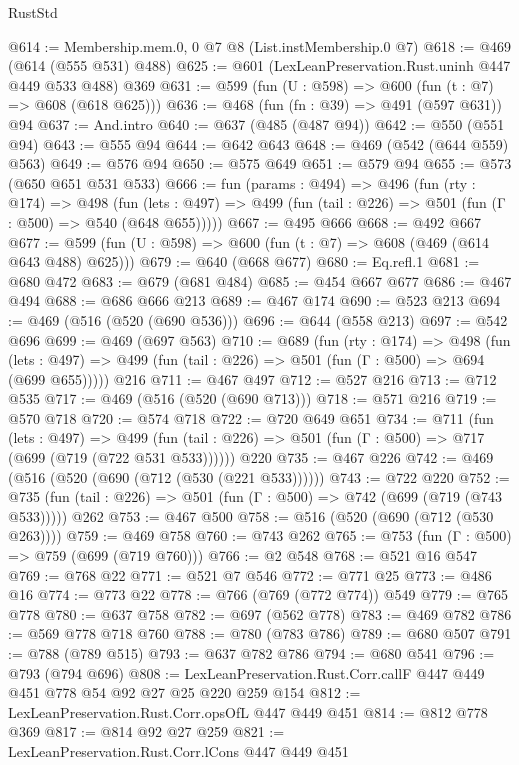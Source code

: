 \begin{lexlean}{RustStd}
\begin{coremodule}
@614 := Membership.mem.{0, 0} @7 @8 (List.instMembership.{0} @7)
@618 := @469 (@614 (@555 @531) @488)
@625 := @601 (LexLeanPreservation.Rust.uninh @447 @449 @533 @488) @369
@631 := @599 (fun (U : @598) => @600 (fun (t : @7) => @608 (@618 @625)))
@636 := @468 (fun (fn : @39) => @491 (@597 @631)) @94
@637 := And.intro
@640 := @637 (@485 (@487 @94))
@642 := @550 (@551 @94)
@643 := @555 @94
@644 := @642 @643
@648 := @469 (@542 (@644 @559) @563)
@649 := @576 @94
@650 := @575 @649
@651 := @579 @94
@655 := @573 (@650 @651 @531 @533)
@666 := fun (params : @494) =>
  @496
    (fun (rty : @174) =>
    @498
      (fun (lets : @497) => @499 (fun (tail : @226) => @501 (fun (Γ : @500) => @540 (@648 @655)))))
@667 := @495 @666
@668 := @492 @667
@677 := @599 (fun (U : @598) => @600 (fun (t : @7) => @608 (@469 (@614 @643 @488) @625)))
@679 := @640 (@668 @677)
@680 := Eq.refl.{1}
@681 := @680 @472
@683 := @679 (@681 @484)
@685 := @454 @667 @677
@686 := @467 @494
@688 := @686 @666 @213
@689 := @467 @174
@690 := @523 @213
@694 := @469 (@516 (@520 (@690 @536)))
@696 := @644 (@558 @213)
@697 := @542 @696
@699 := @469 (@697 @563)
@710 := @689
    (fun (rty : @174) =>
    @498
      (fun (lets : @497) => @499 (fun (tail : @226) => @501 (fun (Γ : @500) => @694 (@699 @655)))))
    @216
@711 := @467 @497
@712 := @527 @216
@713 := @712 @535
@717 := @469 (@516 (@520 (@690 @713)))
@718 := @571 @216
@719 := @570 @718
@720 := @574 @718
@722 := @720 @649 @651
@734 := @711
    (fun (lets : @497) =>
    @499 (fun (tail : @226) => @501 (fun (Γ : @500) => @717 (@699 (@719 (@722 @531 @533))))))
    @220
@735 := @467 @226
@742 := @469 (@516 (@520 (@690 (@712 (@530 (@221 @533))))))
@743 := @722 @220
@752 := @735 (fun (tail : @226) => @501 (fun (Γ : @500) => @742 (@699 (@719 (@743 @533))))) @262
@753 := @467 @500
@758 := @516 (@520 (@690 (@712 (@530 @263))))
@759 := @469 @758
@760 := @743 @262
@765 := @753 (fun (Γ : @500) => @759 (@699 (@719 @760)))
@766 := @2 @548
@768 := @521 @16 @547
@769 := @768 @22
@771 := @521 @7 @546
@772 := @771 @25
@773 := @486 @16
@774 := @773 @22
@778 := @766 (@769 (@772 @774)) @549
@779 := @765 @778
@780 := @637 @758
@782 := @697 (@562 @778)
@783 := @469 @782
@786 := @569 @778 @718 @760
@788 := @780 (@783 @786)
@789 := @680 @507
@791 := @788 (@789 @515)
@793 := @637 @782 @786
@794 := @680 @541
@796 := @793 (@794 @696)
@808 := LexLeanPreservation.Rust.Corr.callF @447 @449 @451 @778 @54 @92 @27 @25 @220 @259 @154
@812 := LexLeanPreservation.Rust.Corr.opsOfL @447 @449 @451
@814 := @812 @778 @369
@817 := @814 @92 @27 @259
@821 := LexLeanPreservation.Rust.Corr.lCons @447 @449 @451

\end{coremodule}
\end{lexlean}
